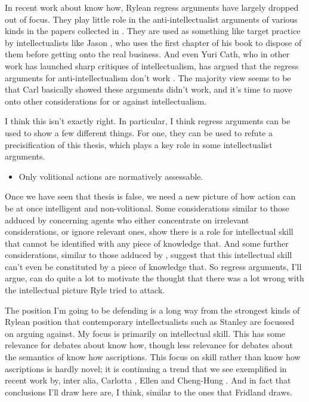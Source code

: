In recent work about know how, Rylean regress arguments have largely dropped out of focus. They play little role in the anti-intellectualist arguments of various kinds in the papers collected in \citet{BengsonMoffett}. They are used as something like target practice by intellectualists like Jason \citet{Stanley2011}, who uses the first chapter of his book to dispose of them before getting onto the real business. And even Yuri Cath, who in other work has launched sharp critiques of intellectualism, has argued that the regress arguments for anti-intellectualism don't work \citep{Cath2011, Cath2013}. The majority view seems to be that Carl \citet{Ginet1975} basically showed these arguments didn't work, and it's time to move onto other considerations for or against intellectualism.

I think this isn't exactly right. In particular, I think regress arguments can be used to show a few different things. For one, they can be used to refute a precisification of this thesis, which plays a key role in some intellectualist arguments.

\begin{itemize}
\item Only volitional actions are normatively assessable.
\end{itemize}
%
Once we have seen that thesis is false, we need a new picture of how action can be at once intelligent and non-volitional. Some considerations similar to those adduced by \citet{Ryle1949} concerning agents who either concentrate on irrelevant considerations, or ignore relevant ones, show there is a role for intellectual skill that cannot be identified with any piece of knowledge that. And some further considerations, similar to those adduced by \citet{Cath2011}, suggest that this intellectual skill can't even be constituted by a piece of knowledge that. So regress arguments, I'll argue, can do quite a lot to motivate the thought that there was a lot wrong with the intellectual picture Ryle tried to attack.

The position I'm going to be defending is a long way from the strongest kinds of Rylean position that contemporary intellectualists such as Stanley are focussed on arguing against. My focus is primarily on intellectual skill. This has some relevance for debates about know how, though less relevance for debates about the semantics of know how ascriptions. This focus on skill rather than know how ascriptions is hardly novel; it is continuing a trend that we see exemplified in recent work by, inter alia, Carlotta \citet{PavesePhD}, Ellen \citet{Fridland2014} and Cheng-Hung \citet{Tsai2014}. And in fact that conclusions I'll draw here are, I think, similar to the ones that Fridland draws.

